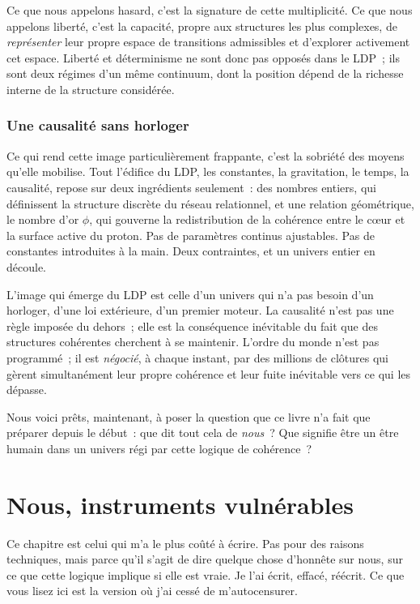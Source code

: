 \documentclass[12pt, a4paper, openright]{book}
\begin{document}
\medskip

Ce que nous appelons hasard, c'est la signature de cette multiplicité. Ce que nous appelons liberté, c'est la capacité, propre aux structures les plus complexes, de \emph{représenter} leur propre espace de transitions admissibles et d'explorer activement cet espace. Liberté et déterminisme ne sont donc pas opposés dans le LDP~; ils sont deux régimes d'un même continuum, dont la position dépend de la richesse interne de la structure considérée.

\subsection*{Une causalité sans horloger}

Ce qui rend cette image particulièrement frappante, c'est la sobriété des moyens qu'elle mobilise. Tout l'édifice du LDP, les constantes, la gravitation, le temps, la causalité, repose sur deux ingrédients seulement~: des nombres entiers, qui définissent la structure discrète du réseau relationnel, et une relation géométrique, le nombre d'or $\phi$, qui gouverne la redistribution de la cohérence entre le c\oe{}ur et la surface active du proton. Pas de paramètres continus ajustables. Pas de constantes introduites à la main. Deux contraintes, et un univers entier en découle.

\medskip

L'image qui émerge du LDP est celle d'un univers qui n'a pas besoin d'un horloger, d'une loi extérieure, d'un premier moteur. La causalité n'est pas une règle imposée du dehors~; elle est la conséquence inévitable du fait que des structures cohérentes cherchent à se maintenir. L'ordre du monde n'est pas programmé~; il est \emph{négocié}, à chaque instant, par des millions de clôtures qui gèrent simultanément leur propre cohérence et leur fuite inévitable vers ce qui les dépasse.

\medskip

Nous voici prêts, maintenant, à poser la question que ce livre n'a fait que préparer depuis le début~: que dit tout cela de \emph{nous}~? Que signifie être un être humain dans un univers régi par cette logique de cohérence~?

\chapter{Nous, instruments vulnérables}

Ce chapitre est celui qui m'a le plus coûté à écrire. Pas pour des raisons techniques, mais parce qu'il s'agit de dire quelque chose d'honnête sur nous, sur ce que cette logique implique si elle est vraie. Je l'ai écrit, effacé, réécrit. Ce que vous lisez ici est la version où j'ai cessé de m'autocensurer.
\end{document}
